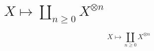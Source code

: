 \documentclass{amsart}
\begin{document}
\section{$X \mapsto \coprod_{n \geq 0} X^{\otimes n}$}
\[
X \mapsto \coprod_{n \geq 0} X^{\otimes n}
\]
\end{document}
